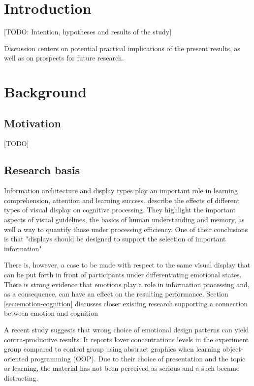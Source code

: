 \clearpage

\section{Introduction}

[TODO: Intention, hypotheses and results of the study]



Discussion centers on potential practical implications of the present results, as well as on prospects for future research.

\clearpage

\section{Background}

	\subsection{Motivation}
	
	[TODO]
	
	
	
		
	\subsection{Research basis} \label{sec:research}
	
	Information architecture and display types play an important role in learning comprehension, attention and learning success. \cite{McCrudden2017} describe the effects of different types of visual display on cognitive processing. They highlight the important aspects of visual guidelines, the basics of human understanding and  memory, as well a way to quantify those under processing efficiency. One of their conclusions is that "displays should be designed to support the selection of important information" \cite[p.633]{McCrudden2017}
	
	There is, however, a case to be made with respect to the same visual display that can be put forth in front of participants under differentiating emotional states. There is strong evidence that emotions play a role in information processing and, as a consequence, can have an effect on the resulting performance. Section \ref{sec:emotion-cognition} discusses closer existing research supporting a connection between emotion and cognition
	
	A recent study \cite{Haaranen2015} suggests that wrong choice of emotional design patterns can yield contra-productive results. It reports lover concentrations levels in the experiment group compared to control group using abstract graphics when learning object-oriented programming (OOP). Due to their choice of presentation and the topic or learning, the material has not been perceived as serious and a such became distracting.
		
